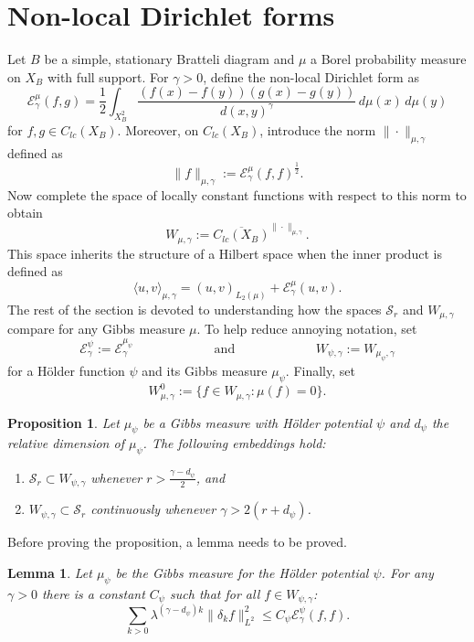 \documentclass[12pt]{amsart}
\theoremstyle{plain}
\newtheorem{proposition}{Proposition}[section]
\newtheorem{lemma}{Lemma}[section]
\theoremstyle{definition}
\begin{document}
\section{Non-local Dirichlet forms}
\label{sec:Dirichlet}
Let $B$ be a simple, stationary Bratteli diagram and $\mu$ a Borel probability measure on $X_B$ with full support. For $\gamma>0$, define the non-local Dirichlet form as
$$\mathcal{E}^\mu_\gamma(f,g) = \frac12 \int_{X^2_B} \frac{(f(x)-f(y))(g(x)-g(y))}{d(x,y)^\gamma}\, d\mu(x)\, d\mu(y)$$
for $f,g\in C_{lc}(X_B)$. Moreover, on $C_{lc}(X_B)$, introduce the norm $\|\cdot \|_{\mu,\gamma}$ defined as
$$\|f\|_{\mu, \gamma}:= \mathcal{E}^\mu_\gamma(f,f)^{\frac12}.$$
Now complete the space of locally constant functions with respect to this norm to obtain
$$W_{\mu,\gamma}:= \overline{C_{lc}(X_B)}^{\|\cdot \|_{\mu, \gamma}}.$$
This space inherits the structure of a Hilbert space when the inner product is defined as
$$\langle u,v\rangle _{\mu,\gamma} = (u,v)_{L_2(\mu)} + \mathcal{E}^\mu_\gamma(u,v).$$
The rest of the section is devoted to understanding how the spaces $\mathcal{S}_r$ and $W_{\mu,\gamma}$ compare for any Gibbs measure $\mu$. To help reduce annoying notation, set 
$$\mathcal{E}^\psi_\gamma := \mathcal{E}^{\mu_\psi}_\gamma \hspace{1in} \mbox{ and } \hspace{1in} W_{\psi,\gamma} := W_{\mu_\psi,\gamma} $$
for a H\"older function $\psi$ and its Gibbs measure $\mu_\psi$. Finally, 
set
$$W_{\mu, \gamma}^0:= \{f\in W_{\mu,\gamma}: \mu(f) = 0 \}.$$
\begin{proposition}
\label{prop:inclusions}
    Let $\mu_\psi$ be a Gibbs measure with H\"older potential $\psi$ and $d_\psi$ the relative dimension of $\mu_\psi$. The following embeddings hold:
    \begin{enumerate}
        \item $\mathcal{S}_r\subset W_{\psi,\gamma}$ whenever $r>\frac{\gamma-d_\psi}{2}$, and
        \item $W_{\psi,\gamma}\subset \mathcal{S}_r $ continuously whenever $\gamma>2(r+d_\psi)$.
    \end{enumerate}
\end{proposition}
Before proving the proposition, a lemma needs to be proved.
\begin{lemma}
\label{lem:L2W}
Let $\mu_\psi$ be the Gibbs measure for the H\"older potential $\psi$. For any $\gamma>0$ there is a constant $C_\psi$ such that for all $f\in W_{\psi,\gamma} $:
$$\sum_{k> 0 }\lambda^{(\gamma -d_\psi) k}\|\delta_k f\|_{L^2}^2 \leq C_\psi \mathcal{E}^\psi _\gamma(f,f).$$
\end{lemma}
\end{document}

